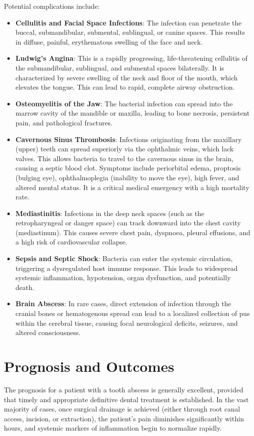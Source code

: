 Potential complications include:
\begin{itemize}
  \item \textbf{Cellulitis and Facial Space Infections}: The infection can penetrate the buccal, submandibular, submental, sublingual, or canine spaces. This results in diffuse, painful, erythematous swelling of the face and neck.
  \item \textbf{Ludwig's Angina}: This is a rapidly progressing, life-threatening cellulitis of the submandibular, sublingual, and submental spaces bilaterally. It is characterized by severe swelling of the neck and floor of the mouth, which elevates the tongue. This can lead to rapid, complete airway obstruction.
  \item \textbf{Osteomyelitis of the Jaw}: The bacterial infection can spread into the marrow cavity of the mandible or maxilla, leading to bone necrosis, persistent pain, and pathological fractures.
  \item \textbf{Cavernous Sinus Thrombosis}: Infections originating from the maxillary (upper) teeth can spread superiorly via the ophthalmic veins, which lack valves. This allows bacteria to travel to the cavernous sinus in the brain, causing a septic blood clot. Symptoms include periorbital edema, proptosis (bulging eye), ophthalmoplegia (inability to move the eye), high fever, and altered mental status. It is a critical medical emergency with a high mortality rate.
  \item \textbf{Mediastinitis}: Infections in the deep neck spaces (such as the retropharyngeal or danger space) can track downward into the chest cavity (mediastinum). This causes severe chest pain, dyspnoea, pleural effusions, and a high risk of cardiovascular collapse.
  \item \textbf{Sepsis and Septic Shock}: Bacteria can enter the systemic circulation, triggering a dysregulated host immune response. This leads to widespread systemic inflammation, hypotension, organ dysfunction, and potentially death.
  \item \textbf{Brain Abscess}: In rare cases, direct extension of infection through the cranial bones or hematogenous spread can lead to a localized collection of pus within the cerebral tissue, causing focal neurological deficits, seizures, and altered consciousness.
\end{itemize}

\section*{Prognosis and Outcomes}
The prognosis for a patient with a tooth abscess is generally excellent, provided that timely and appropriate definitive dental treatment is established. In the vast majority of cases, once surgical drainage is achieved (either through root canal access, incision, or extraction), the patient's pain diminishes significantly within hours, and systemic markers of inflammation begin to normalize rapidly.

